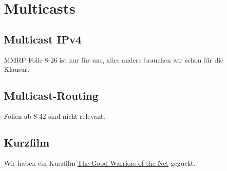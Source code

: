 \documentclass[a4paper]{article}
\title{\docTitle}
\author{Moritz}
\date{\today}
\begin{document}
\maketitle
\tableofcontents


\section{Multicasts}

\subsection{Multicast IPv4}

MMRP Folie 8-26 ist nur für uns, alles andere brauchen wir schon für die Klausur.

\subsection{Multicast-Routing}

Folien ab 8-42 sind nicht relevant.

\subsection{Kurzfilm}

Wir haben ein Kurzfilm \href{https://www.youtube.com/watch?v=x9XWxD6cJuY}{The Good Warriors of the Net} geguckt.
\end{document}
